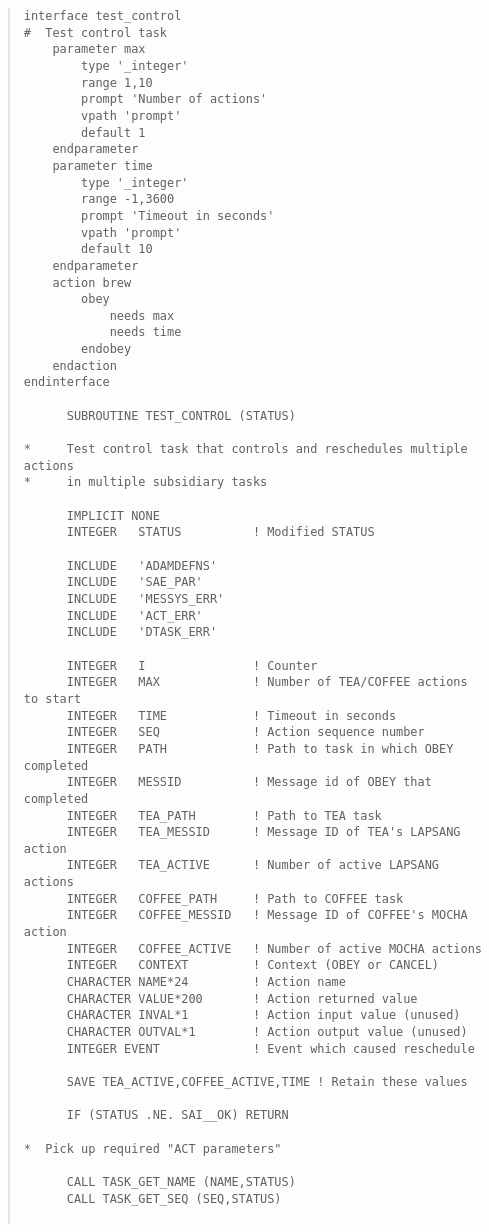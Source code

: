 \documentclass[twoside,11pt]{article}
\renewcommand{\_}{\texttt{\symbol{95}}}
\begin{document}
\small \begin{quote} \begin{verbatim}
interface test_control
#  Test control task
    parameter max
        type '_integer'
        range 1,10
        prompt 'Number of actions'
        vpath 'prompt'
        default 1
    endparameter
    parameter time
        type '_integer'
        range -1,3600
        prompt 'Timeout in seconds'
        vpath 'prompt'
        default 10
    endparameter
    action brew
        obey
            needs max
            needs time
        endobey
    endaction
endinterface

      SUBROUTINE TEST_CONTROL (STATUS)

*     Test control task that controls and reschedules multiple actions
*     in multiple subsidiary tasks

      IMPLICIT NONE
      INTEGER   STATUS          ! Modified STATUS

      INCLUDE   'ADAMDEFNS'
      INCLUDE   'SAE_PAR'
      INCLUDE   'MESSYS_ERR'
      INCLUDE   'ACT_ERR'
      INCLUDE   'DTASK_ERR'

      INTEGER   I               ! Counter
      INTEGER   MAX             ! Number of TEA/COFFEE actions to start
      INTEGER   TIME            ! Timeout in seconds
      INTEGER   SEQ             ! Action sequence number
      INTEGER   PATH            ! Path to task in which OBEY completed
      INTEGER   MESSID          ! Message id of OBEY that completed
      INTEGER   TEA_PATH        ! Path to TEA task
      INTEGER   TEA_MESSID      ! Message ID of TEA's LAPSANG action
      INTEGER   TEA_ACTIVE      ! Number of active LAPSANG actions
      INTEGER   COFFEE_PATH     ! Path to COFFEE task
      INTEGER   COFFEE_MESSID   ! Message ID of COFFEE's MOCHA action
      INTEGER   COFFEE_ACTIVE   ! Number of active MOCHA actions
      INTEGER   CONTEXT         ! Context (OBEY or CANCEL)
      CHARACTER NAME*24         ! Action name
      CHARACTER VALUE*200       ! Action returned value
      CHARACTER INVAL*1         ! Action input value (unused)
      CHARACTER OUTVAL*1        ! Action output value (unused)
      INTEGER EVENT             ! Event which caused reschedule

      SAVE TEA_ACTIVE,COFFEE_ACTIVE,TIME ! Retain these values

      IF (STATUS .NE. SAI__OK) RETURN

*  Pick up required "ACT parameters"

      CALL TASK_GET_NAME (NAME,STATUS)
      CALL TASK_GET_SEQ (SEQ,STATUS)


\end{verbatim}
\end{quote}
\end{document}
